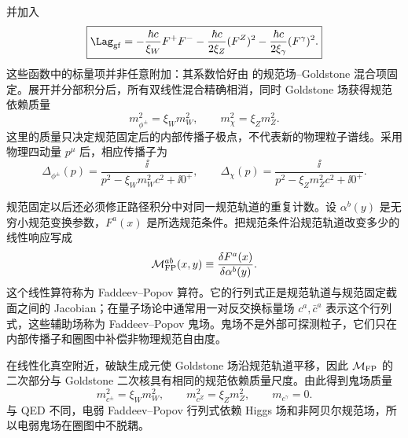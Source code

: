 并加入
\begin{equation}
 \boxed{
 \Lag_{\rm gf}
 =-\frac{\hbar c}{\xi_W}F^+F^-
 -\frac{\hbar c}{2\xi_Z}(F^Z)^2
 -\frac{\hbar c}{2\xi_\gamma}(F^\gamma)^2.}
 \label{eq:sm-rxi-gf-lagrangian-dp11}
\end{equation}
这些函数中的标量项并非任意附加：其系数恰好由 的规范场--Goldstone 混合项固定。展开并分部积分后，所有双线性混合精确相消，同时 Goldstone 场获得规范依赖质量
\begin{equation}
 \boxed{
 m_{\phi^\pm}^2=\xi_Wm_W^2,
 \qquad
 m_{\chi}^2=\xi_Zm_Z^2.}
 \label{eq:sm-rxi-goldstone-masses-dp11}
\end{equation}
这里的质量只决定规范固定后的内部传播子极点，不代表新的物理粒子谱线。采用物理四动量 $p^\mu$ 后，相应传播子为
\begin{equation*}
 \Delta_{\phi^\pm}(p)
 =\frac{\ii}{p^2-\xi_Wm_W^2c^2+\ii0^+},
 \qquad
 \Delta_{\chi}(p)
 =\frac{\ii}{p^2-\xi_Zm_Z^2c^2+\ii0^+}.
\end{equation*}

规范固定以后还必须修正路径积分中对同一规范轨道的重复计数。设 $\alpha^b(y)$ 是无穷小规范变换参数，$F^a(x)$ 是所选规范条件。把规范条件沿规范轨道改变多少的线性响应写成
\begin{equation*}
 \mathcal M_{\rm FP}^{ab}(x,y)
 \equiv
 \frac{\delta F^a(x)}{\delta\alpha^b(y)}.
\end{equation*}
这个线性算符称为 Faddeev--Popov 算符。它的行列式正是规范轨道与规范固定截面之间的 Jacobian；在量子场论中通常用一对反交换标量场 $c^a,\bar c^a$ 表示这个行列式，这些辅助场称为 Faddeev--Popov 鬼场。鬼场不是外部可探测粒子，它们只在内部传播子和圈图中补偿非物理规范自由度。

在线性化真空附近，破缺生成元使 Goldstone 场沿规范轨道平移，因此 $\mathcal M_{\rm FP}$ 的二次部分与 Goldstone 二次核具有相同的规范依赖质量尺度。由此得到鬼场质量
\begin{equation}
 \boxed{
 m_{c^\pm}^2=\xi_Wm_W^2,
 \qquad
 m_{c^Z}^2=\xi_Zm_Z^2,
 \qquad
 m_{c^\gamma}=0.}
 \label{eq:sm-rxi-ghost-masses-dp11}
\end{equation}
与 QED 不同，电弱 Faddeev--Popov 行列式依赖 Higgs 场和非阿贝尔规范场，所以电弱鬼场在圈图中不脱耦。

